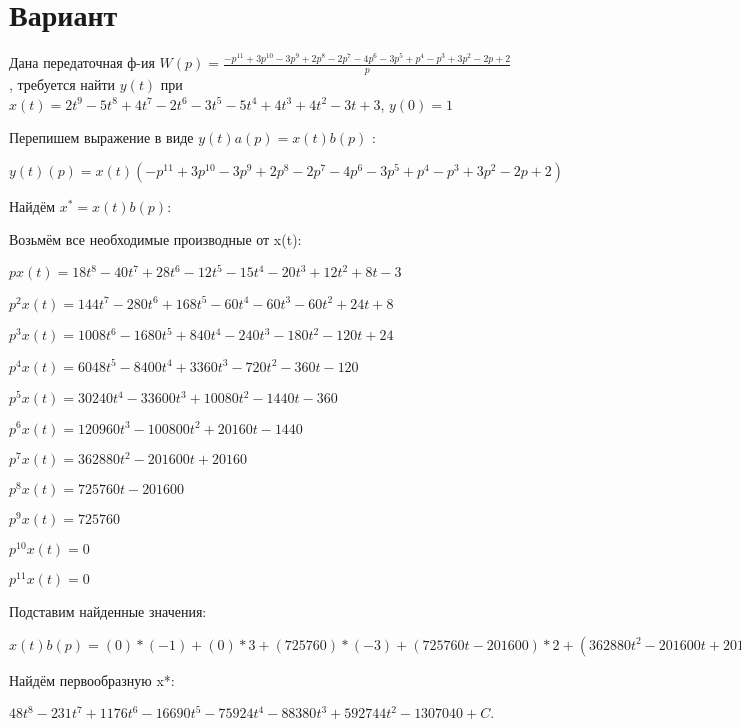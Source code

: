 \documentclass{article}
\begin{document}
{{{{{\section{Вариант}

Дана передаточная ф-ия $W(p)=\frac{-p^{11}+3p^{10}-3p^{9}+2p^{8}-2p^{7}-4p^{6}-3p^{5}+p^{4}-p^{3}+3p^{2}-2p+2}{p}$, требуется найти $y(t)$ при $x(t)=2t^{9}-5t^{8}+4t^{7}-2t^{6}-3t^{5}-5t^{4}+4t^{3}+4t^{2}-3t+3$, $y(0)=1$

Перепишем выражение в виде $y(t)a(p)=x(t)b(p)$ :

$y(t)(p)=x(t)(-p^{11}+3p^{10}-3p^{9}+2p^{8}-2p^{7}-4p^{6}-3p^{5}+p^{4}-p^{3}+3p^{2}-2p+2)$

Найдём $x^*=x(t)b(p)$:

Возьмём все необходимые производные от x(t):

$px(t)=18t^{8}-40t^{7}+28t^{6}-12t^{5}-15t^{4}-20t^{3}+12t^{2}+8t-3$

$p^2x(t)=144t^{7}-280t^{6}+168t^{5}-60t^{4}-60t^{3}-60t^{2}+24t+8$

$p^3x(t)=1008t^{6}-1680t^{5}+840t^{4}-240t^{3}-180t^{2}-120t+24$

$p^4x(t)=6048t^{5}-8400t^{4}+3360t^{3}-720t^{2}-360t-120$

$p^5x(t)=30240t^{4}-33600t^{3}+10080t^{2}-1440t-360$

$p^6x(t)=120960t^{3}-100800t^{2}+20160t-1440$

$p^7x(t)=362880t^{2}-201600t+20160$

$p^8x(t)=725760t-201600$

$p^9x(t)=725760$

$p^10x(t)=0$

$p^11x(t)=0$

Подставим найденные значения:

$x(t)b(p) = (0)*(-1)+(0)*3+(725760)*(-3)+(725760t-201600)*2+(362880t^{2}-201600t+20160)*(-2)+(120960t^{3}-100800t^{2}+20160t-1440)*(-4)+(30240t^{4}-33600t^{3}+10080t^{2}-1440t-360)*(-3)+(6048t^{5}-8400t^{4}+3360t^{3}-720t^{2}-360t-120)*1+(1008t^{6}-1680t^{5}+840t^{4}-240t^{3}-180t^{2}-120t+24)*(-1)+(144t^{7}-280t^{6}+168t^{5}-60t^{4}-60t^{3}-60t^{2}+24t+8)*3+(18t^{8}-40t^{7}+28t^{6}-12t^{5}-15t^{4}-20t^{3}+12t^{2}+8t-3)*(-2)+(18t^{8}-40t^{7}+28t^{6}-12t^{5}-15t^{4}-20t^{3}+12t^{2}+8t-3)*2=432t^{7}-1848t^{6}+8232t^{5}-100140t^{4}-379620t^{3}-353520t^{2}+1778232t$





Найдём первообразную x*:

$48t^{8}-231t^{7}+1176t^{6}-16690t^{5}-75924t^{4}-88380t^{3}+592744t^{2}-1307040+C.$

}}}}}
\end{document}
